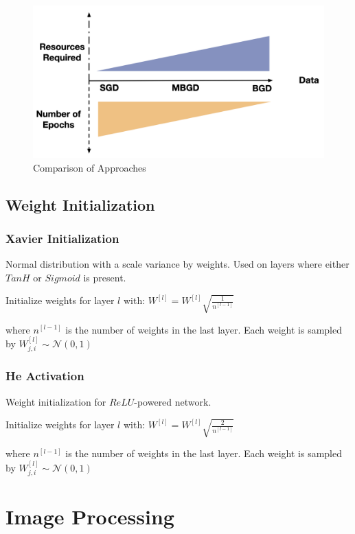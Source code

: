 \documentclass[11pt,a4paper]{article}
\begin{document}
\begin{center}\begin{figure}[htbp]
    \centering
    \includegraphics[scale=0.1]{resource.png}
    \caption{Comparison of Approaches}
    \label{}
\end{figure}\end{center}

\subsection{Weight Initialization}
\subsubsection{Xavier Initialization}
Normal distribution with a scale variance by weights. Used on layers where either $TanH$ or $Sigmoid$ is present.
\begin{center}
    Initialize weights for layer $l$ with: $W^{[l]}=W^{[l]}\sqrt{\frac{1}{n^{[l-1]}}}$
\end{center}
where $n^{[l-1]}$ is the number of weights in the last layer. Each weight is sampled by $W_{j,i}^{[l]}\sim \mathcal{N}(0,1)$

\subsubsection{He Activation}
Weight initialization for $ReLU$-powered network.
\begin{center}
    Initialize weights for layer $l$ with: $W^{[l]}=W^{[l]}\sqrt{\frac{2}{n^{[l-1]}}}$
\end{center}
where $n^{[l-1]}$ is the number of weights in the last layer. Each weight is sampled by $W_{j,i}^{[l]}\sim \mathcal{N}(0,1)$

\section{Image Processing}
\end{document}
